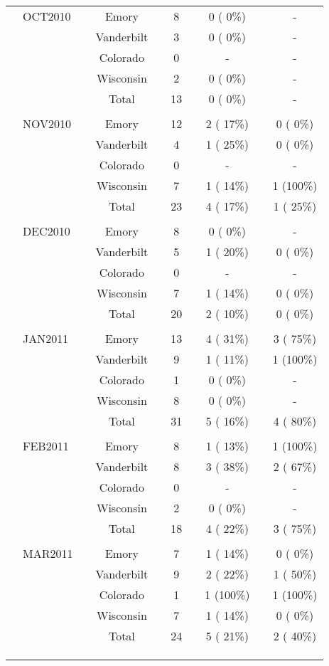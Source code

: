 \documentclass[dvips,10pt]{article}
\begin{document}
\begin{table}[t]
\begin{center}
\begin{tabular}{ @{}l@{}
@{}l@{}@{}p{1.5em}@{}@{}c@{}@{}p{1.5em}@{}@{}c@{}@{}p{1.5em}@{}@{}c@{}@{}p{1.5em}@{}@{}c@{}
}
\\
& OCT2010 && Emory && 8 && 0 (  0\%) && - \\
&  && Vanderbilt && 3 && 0 (  0\%) && - \\
&  && Colorado && 0 && - && - \\
&  && Wisconsin && 2 && 0 (  0\%) && - \\
&  && Total && 13 && 0 (  0\%) && - \\
&  &&  &&  &&  &&  \\
& NOV2010 && Emory && 12 && 2 ( 17\%) && 0 (  0\%) \\
&  && Vanderbilt && 4 && 1 ( 25\%) && 0 (  0\%) \\
&  && Colorado && 0 && - && - \\
&  && Wisconsin && 7 && 1 ( 14\%) && 1 (100\%) \\
&  && Total && 23 && 4 ( 17\%) && 1 ( 25\%) \\
&  &&  &&  &&  &&  \\
& DEC2010 && Emory && 8 && 0 (  0\%) && - \\
&  && Vanderbilt && 5 && 1 ( 20\%) && 0 (  0\%) \\
&  && Colorado && 0 && - && - \\
&  && Wisconsin && 7 && 1 ( 14\%) && 0 (  0\%) \\
&  && Total && 20 && 2 ( 10\%) && 0 (  0\%) \\
&  &&  &&  &&  &&  \\
& JAN2011 && Emory && 13 && 4 ( 31\%) && 3 ( 75\%) \\
&  && Vanderbilt && 9 && 1 ( 11\%) && 1 (100\%) \\
&  && Colorado && 1 && 0 (  0\%) && - \\
&  && Wisconsin && 8 && 0 (  0\%) && - \\
&  && Total && 31 && 5 ( 16\%) && 4 ( 80\%) \\
&  &&  &&  &&  &&  \\
& FEB2011 && Emory && 8 && 1 ( 13\%) && 1 (100\%) \\
&  && Vanderbilt && 8 && 3 ( 38\%) && 2 ( 67\%) \\
&  && Colorado && 0 && - && - \\
&  && Wisconsin && 2 && 0 (  0\%) && - \\
&  && Total && 18 && 4 ( 22\%) && 3 ( 75\%) \\
&  &&  &&  &&  &&  \\
& MAR2011 && Emory && 7 && 1 ( 14\%) && 0 (  0\%) \\
&  && Vanderbilt && 9 && 2 ( 22\%) && 1 ( 50\%) \\
&  && Colorado && 1 && 1 (100\%) && 1 (100\%) \\
&  && Wisconsin && 7 && 1 ( 14\%) && 0 (  0\%) \\
&  && Total && 24 && 5 ( 21\%) && 2 ( 40\%) \\
&  &&  &&  &&  &&  \\
\\
\hline \\


\end{tabular}
\end{center}
\end{table}
\end{document}
